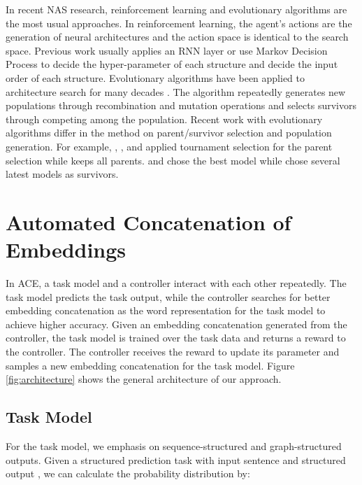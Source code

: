 \documentclass[11pt,a4paper]{article}
\begin{document}
In recent NAS research, reinforcement learning and evolutionary algorithms are the most usual approaches. 
In reinforcement learning, the agent's actions are the generation of neural architectures and the action space is identical to the search space. Previous work usually applies an RNN layer \citep{zoph2016neural,zhong2018practical,zoph2018learning} or use Markov Decision Process \citep{baker2016designing} to decide the hyper-parameter of each structure and decide the input order of each structure.
Evolutionary algorithms have been applied to architecture search for many decades \citep{geoffrey1989designing,angeline1994evolutionary,stanley2002evolving,floreano2008neuroevolution,jozefowicz2015empirical}. The algorithm repeatedly generates new populations through recombination and mutation operations and selects survivors through competing among the population. Recent work with evolutionary algorithms differ in the method on parent/survivor selection and population generation. For example, \citet{real2017large}, \citet{liu2018hierarchical}, \citet{wistuba2018deep} and \citet{real2019regularized} applied tournament selection \citep{goldberg1991comparative} for the parent selection while \citet{xie2017genetic} keeps all parents. \citet{suganuma2017genetic} and \citet{elsken2017simple} chose the best model while \citet{real2019regularized} chose several latest models as survivors.







\section{Automated Concatenation of Embeddings}
In ACE, a task model and a controller interact with each other repeatedly. The task model predicts the task output, while the controller searches for better embedding concatenation as the word representation for the task model to achieve higher accuracy. Given an embedding concatenation generated from the controller, the task model is trained over the task data and returns a reward to the controller. The controller receives the reward to update its parameter and samples a new embedding concatenation for the task model. 
Figure \ref{fig:architecture} shows the general architecture of our approach.
\subsection{Task Model}
For the task model, we emphasis on sequence-structured and graph-structured outputs. Given a structured prediction task with input sentence  and structured output , we can calculate the probability distribution  by:
\end{document}
